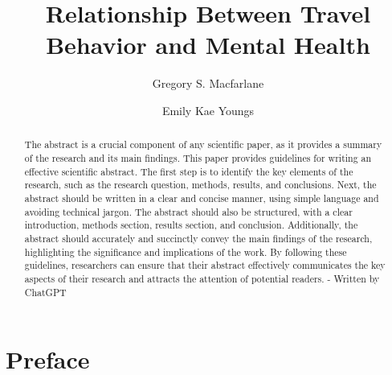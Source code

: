 \documentclass[
  letterpaper,
  authoryear]{elsarticle}
\begin{document}
\begin{frontmatter}
\title{Relationship Between Travel Behavior and Mental Health}
\author[1]{Gregory S. Macfarlane%
%
}
\author[1]{Emily Kae Youngs%
%
}




        
\begin{abstract}
The abstract is a crucial component of any scientific paper, as it
provides a summary of the research and its main findings. This paper
provides guidelines for writing an effective scientific abstract. The
first step is to identify the key elements of the research, such as the
research question, methods, results, and conclusions. Next, the abstract
should be written in a clear and concise manner, using simple language
and avoiding technical jargon. The abstract should also be structured,
with a clear introduction, methods section, results section, and
conclusion. Additionally, the abstract should accurately and succinctly
convey the main findings of the research, highlighting the significance
and implications of the work. By following these guidelines, researchers
can ensure that their abstract effectively communicates the key aspects
of their research and attracts the attention of potential readers. -
Written by ChatGPT
\end{abstract}





\end{frontmatter}
    \ifdefined\Shaded\renewenvironment{Shaded}{\begin{tcolorbox}[breakable, enhanced, sharp corners, frame hidden, interior hidden, boxrule=0pt, borderline west={3pt}{0pt}{shadecolor}]}{\end{tcolorbox}}\fi


\hypertarget{preface}{%
\section*{Preface}\label{preface}}

\end{document}
